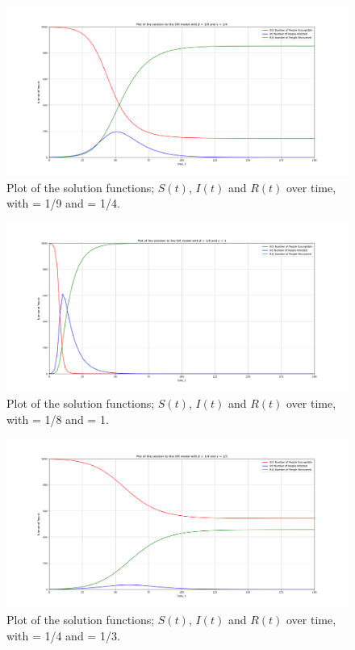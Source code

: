 \begin{figure}
\includegraphics {Q2_plot2.png}
\caption{Plot of the solution functions; $S(t)$, $I(t)$ and $R(t)$ over time, with \beta = 1/9 and \gamma = 1/4.}
\label{fig:figureOfSIRPlot}
\end{figure}

\begin{figure}
\includegraphics {Q2_plot3.png}
\caption{Plot of the solution functions; $S(t)$, $I(t)$ and $R(t)$ over time, with \beta = 1/8 and \gamma = 1.}
\label{fig:figureOfSIRPlot}
\end{figure}

\begin{figure}
\includegraphics {Q2_plot4.png}
\caption{Plot of the solution functions; $S(t)$, $I(t)$ and $R(t)$ over time, with \beta = 1/4 and \gamma = 1/3.}
\label{fig:figureOfSIRPlot}
\end{figure}



